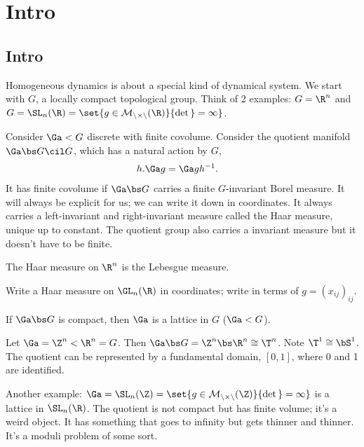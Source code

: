 \chapter{Intro}

\section{Intro}

Homogeneous dynamics is about a special kind of dynamical system. We start with $G$, a locally compact topological group. Think of 2 examples: $G=\R^n$ and $G=\SL_n(\R)=\set{g\in\cal M_{n\times n}(\R)}{\det g=1}$. 

Consider $\Ga<G$ discrete with finite covolume. Consider the quotient manifold $\Ga \bs G \cil G$, which has a natural action by $G$,
\begin{align}
h.\Ga g &=\Ga gh^{-1}.
\end{align}
It has finite covolume if $\Ga \bs G$ carries a finite $G$-invariant Borel measure. It will always be explicit for us; we can write it down in coordinates.
It always carries a left-invariant and right-invariant measure called the Haar measure, unique up to constant. The quotient group also carries a invariant measure but it doesn't have to be finite. 

The Haar measure on $\R^n$ is the Lebesgue measure.

\begin{exr} Write a Haar measure on $\GL_n(\R)$ in coordinates; write in terms of $g=(x_{ij})_{ij}$. 
\end{exr}
\begin{rem}
If $\Ga\bs G$ is compact, then $\Ga$ is a lattice in $G$ ($\Ga < G$). 
\end{rem}

\begin{ex}
Let $\Ga = \Z^n<\R^n=G$. 
Then $\Ga \bs G = \Z^n\bs \R^n\cong \T^n$.
Note $\T^1\cong \bS^1$. 
The quotient can be represented by a fundamental domain, $[0,1]$, where 0 and 1 are identified.
\end{ex}
\begin{ex}
Another example: $\Ga = \SL_n(\Z) = \set{g\in \cal M_{n\times n} (\Z)}{\det g=1}$ is a lattice in $\SL_n(\R)$.  
The quotient is not compact but has finite volume; it's a weird object. It has something that goes to infinity but gets thinner and thinner.
It's a moduli problem of some sort.
\end{ex}

